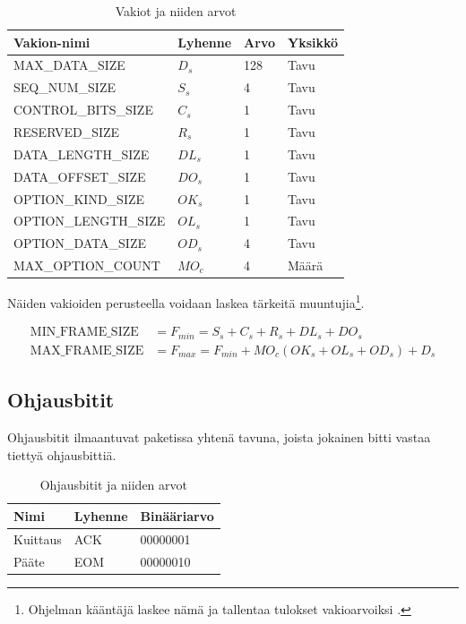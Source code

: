 \documentclass[a4paper,12pt]{article}
\begin{document}
    \begin{table}[h!]
        \centering
        \begin{tabular}{llll}
            Vakion-nimi & Lyhenne & Arvo & Yksikkö \\
            \hline
            MAX\_DATA\_SIZE & $D_s$ & 128 & Tavu \\
            SEQ\_NUM\_SIZE & $S_s$ & 4 & Tavu \\
            CONTROL\_BITS\_SIZE & $C_s$ & 1 & Tavu \\
            RESERVED\_SIZE & $R_s$ & 1 & Tavu \\
            DATA\_LENGTH\_SIZE & $DL_s$ & 1 & Tavu \\
            DATA\_OFFSET\_SIZE & $DO_s$ & 1 & Tavu \\
            OPTION\_KIND\_SIZE & $OK_s$ & 1 & Tavu \\
            OPTION\_LENGTH\_SIZE & $OL_s$ & 1 & Tavu \\
            OPTION\_DATA\_SIZE & $OD_s$ & 4 & Tavu \\
            MAX\_OPTION\_COUNT & $MO_c$ & 4 & Määrä
        \end{tabular}
        \caption{Vakiot ja niiden arvot}
        \label{tab:vakiot}
    \end{table}

    Näiden vakioiden perusteella voidaan laskea tärkeitä muuntujia\footnote{Ohjelman kääntäjä laskee nämä ja tallentaa tulokset vakioarvoiksi \cite{rust_book_constant_evaluation}.}.

    \begin{align}
        \text{MIN\_FRAME\_SIZE} &= F_{min} = S_s + C_s + R_s + DL_s + DO_s \\
        \text{MAX\_FRAME\_SIZE} &= F_{max} = F_{min} + MO_c(OK_s + OL_s + OD_s) + D_s \label{eq:fmax}
    \end{align}


    \subsection{Ohjausbitit}\label{subsec:control_bits}
    Ohjausbitit ilmaantuvat paketissa yhtenä tavuna, joista jokainen bitti vastaa tiettyä ohjausbittiä.

    \begin{table}[h!]
        \centering
        \begin{tabular}{lll}
            Nimi & Lyhenne & Binääriarvo \\
            \hline
            Kuittaus & ACK & 00000001 \\
            Pääte & EOM & 00000010 \\
        \end{tabular}
        \caption{Ohjausbitit ja niiden arvot}
        \label{tab:control_bits}
    \end{table}
\end{document}
